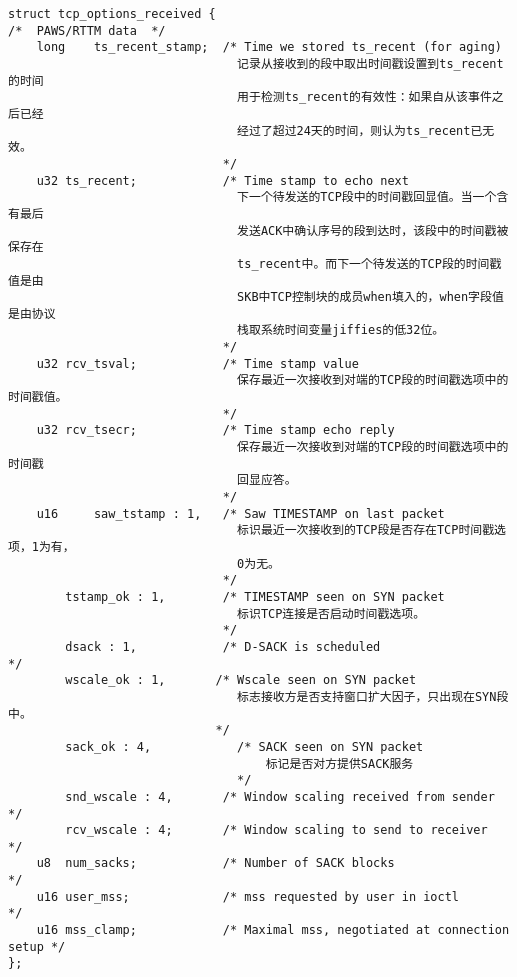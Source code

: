 \begin{verbatim}
struct tcp_options_received {
/*  PAWS/RTTM data  */
    long    ts_recent_stamp;  /* Time we stored ts_recent (for aging)        
                                记录从接收到的段中取出时间戳设置到ts_recent的时间
                                用于检测ts_recent的有效性：如果自从该事件之后已经
                                经过了超过24天的时间，则认为ts_recent已无效。
                              */
    u32 ts_recent;            /* Time stamp to echo next                     
                                下一个待发送的TCP段中的时间戳回显值。当一个含有最后
                                发送ACK中确认序号的段到达时，该段中的时间戳被保存在
                                ts_recent中。而下一个待发送的TCP段的时间戳值是由
                                SKB中TCP控制块的成员when填入的，when字段值是由协议
                                栈取系统时间变量jiffies的低32位。
                              */
    u32 rcv_tsval;            /* Time stamp value                            
                                保存最近一次接收到对端的TCP段的时间戳选项中的时间戳值。
                              */
    u32 rcv_tsecr;            /* Time stamp echo reply                       
                                保存最近一次接收到对端的TCP段的时间戳选项中的时间戳
                                回显应答。
                              */
    u16     saw_tstamp : 1,   /* Saw TIMESTAMP on last packet                
                                标识最近一次接收到的TCP段是否存在TCP时间戳选项，1为有，
                                0为无。
                              */
        tstamp_ok : 1,        /* TIMESTAMP seen on SYN packet                
                                标识TCP连接是否启动时间戳选项。
                              */
        dsack : 1,            /* D-SACK is scheduled                         */
        wscale_ok : 1,       /* Wscale seen on SYN packet                   
                                标志接收方是否支持窗口扩大因子，只出现在SYN段中。   
                             */
        sack_ok : 4,            /* SACK seen on SYN packet                     
                                    标记是否对方提供SACK服务
                                */
        snd_wscale : 4,       /* Window scaling received from sender         */
        rcv_wscale : 4;       /* Window scaling to send to receiver          */
    u8  num_sacks;            /* Number of SACK blocks                       */
    u16 user_mss;             /* mss requested by user in ioctl              */
    u16 mss_clamp;            /* Maximal mss, negotiated at connection setup */
};
\end{verbatim} 

